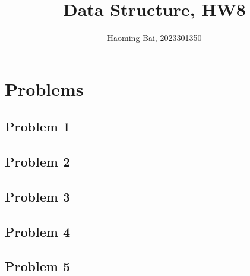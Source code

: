 \documentclass{ctexart}
\title{Data Structure, HW8}
\author{Haoming Bai, 2023301350}
\begin{document}
	\maketitle
  \tableofcontents
  \section{Problems}
  \subsection{Problem 1}
  
  \subsection{Problem 2}
  
  \subsection{Problem 3}
  
  \subsection{Problem 4}
  
  \subsection{Problem 5}
  
\end{document}
